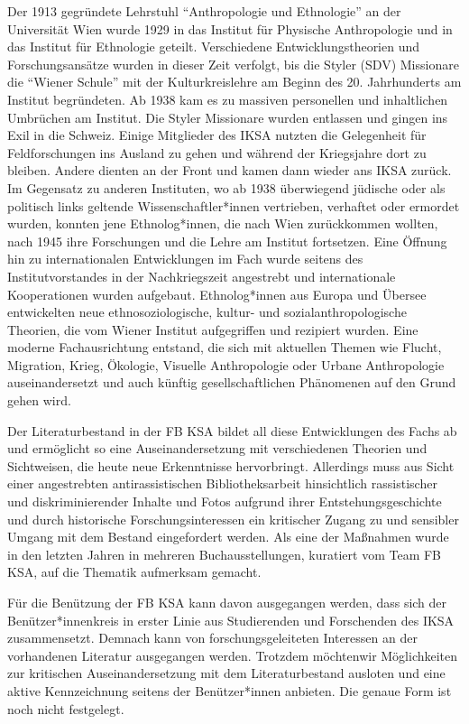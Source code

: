 \documentclass[a4paper,
fontsize=11pt,
oneside,
numbers=noperiodatend,
parskip=half-,
bibliography=totoc,
final
]{scrartcl}
\begin{document}
Der 1913 gegründete Lehrstuhl \enquote{Anthropologie und Ethnologie} an
der Universität Wien wurde 1929 in das Institut für Physische
Anthropologie und in das Institut für Ethnologie geteilt. Verschiedene
Entwicklungstheorien und Forschungsansätze wurden in dieser Zeit
verfolgt, bis die Styler (SDV) Missionare die \enquote{Wiener Schule}
mit der Kulturkreislehre am Beginn des 20. Jahrhunderts am Institut
begründeten. Ab 1938 kam es zu massiven personellen und inhaltlichen
Umbrüchen am Institut. Die Styler Missionare wurden entlassen und gingen
ins Exil in die Schweiz. Einige Mitglieder des IKSA nutzten die
Gelegenheit für Feldforschungen ins Ausland zu gehen und während der
Kriegsjahre dort zu bleiben. Andere dienten an der Front und kamen dann
wieder ans IKSA zurück. Im Gegensatz zu anderen Instituten, wo ab 1938
überwiegend jüdische oder als politisch links geltende
Wissenschaftler*innen vertrieben, verhaftet oder ermordet wurden,
konnten jene Ethnolog*innen, die nach Wien zurückkommen wollten, nach
1945 ihre Forschungen und die Lehre am Institut fortsetzen. Eine Öffnung
hin zu internationalen Entwicklungen im Fach wurde seitens des
Institutvorstandes in der Nachkriegszeit angestrebt und internationale
Kooperationen wurden aufgebaut. Ethnolog*innen aus Europa und Übersee
entwickelten neue ethnosoziologische, kultur- und sozialanthropologische
Theorien, die vom Wiener Institut aufgegriffen und rezipiert wurden.
Eine moderne Fachausrichtung entstand, die sich mit aktuellen Themen wie
Flucht, Migration, Krieg, Ökologie, Visuelle Anthropologie oder Urbane
Anthropologie auseinandersetzt und auch künftig gesellschaftlichen
Phänomenen auf den Grund gehen wird.

Der Literaturbestand in der FB KSA bildet all diese Entwicklungen des
Fachs ab und ermöglicht so eine Auseinandersetzung mit verschiedenen
Theorien und Sichtweisen, die heute neue Erkenntnisse hervorbringt.
Allerdings muss aus Sicht einer angestrebten antirassistischen
Bibliotheksarbeit hinsichtlich rassistischer und diskriminierender
Inhalte und Fotos aufgrund ihrer Entstehungsgeschichte und durch
historische Forschungsinteressen ein kritischer Zugang zu und sensibler
Umgang mit dem Bestand eingefordert werden. Als eine der Maßnahmen wurde
in den letzten Jahren in mehreren Buchausstellungen, kuratiert vom Team
FB KSA, auf die Thematik aufmerksam gemacht.

Für die Benützung der FB KSA kann davon ausgegangen werden, dass sich
der Benützer*innen\-kreis in erster Linie aus Studierenden und Forschenden
des IKSA zusammensetzt. Demnach kann von forschungsgeleiteten Interessen
an der vorhandenen Literatur ausgegangen werden. Trotzdem möchtenwir
Möglichkeiten zur kritischen Auseinandersetzung mit dem Literaturbestand
ausloten und eine aktive Kennzeichnung seitens der Benützer*innen
anbieten. Die genaue Form ist noch nicht festgelegt.
\end{document}
